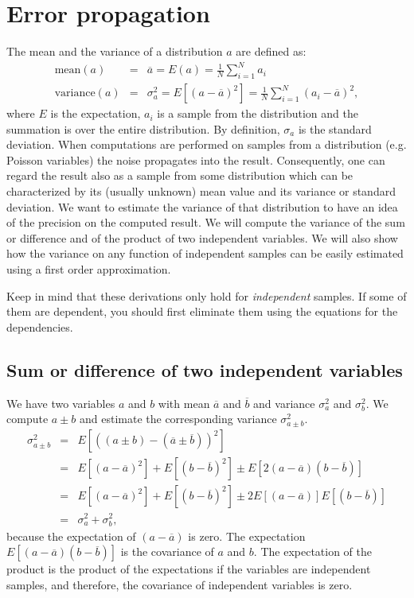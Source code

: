 \newpage
\section{Error propagation} \label{app:error}
The mean and the variance of a distribution $a$ are defined as:
\begin{align}
  \mbox{mean}(a) & = & \overline{a} = E(a) = \frac{1}{N} \sum_{i=1}^N a_i\\
  \mbox{variance}(a) & = & \sigma_a^2 = E\left[ (a - \overline{a})^2 \right]
   = \frac{1}{N} \sum_{i=1}^N (a_i - \overline{a})^2,
\end{align}
where $E$ is the expectation, $a_i$ is a sample from the distribution and the
summation is over the entire distribution. By definition, $\sigma_a$ is the
standard deviation. When computations are performed on samples from a
distribution (e.g. Poisson variables) the noise propagates into the
result. Consequently, one can regard the result also as a sample from some
distribution which can be characterized by its (usually unknown) mean value
and its variance or standard deviation. We want to estimate the variance of
that distribution to have an idea of the precision on the computed result. We
will compute the variance of the sum or difference and of the product of two
independent variables. We will also show how the variance on any function of
independent samples can be easily estimated using a first order approximation.

Keep in mind that these derivations only hold for {\em independent}
samples. If some of them are dependent, you should first eliminate them using
the equations for the dependencies.

\subsection{Sum or difference of two independent variables}
We have two variables $a$ and $b$ with mean $\overline{a}$ and $\overline{b}$
and variance $\sigma_a^2$ and $\sigma_b^2$. We compute $a \pm b$ and estimate
the corresponding variance $\sigma_{a \pm b}^2$.
\begin{align}
\sigma_{a \pm b}^2 & = & E\left[\left((a \pm b) - (\overline{a} \pm \overline{b}) \right)^2\right]
           \nonumber\\
 & = & E\left[(a-\overline{a})^2\right] + E\left[(b-\overline{b})^2\right] \pm E\left[2(a-\overline{a})(b-\overline{b})\right]
           \nonumber\\
 & = & E\left[(a-\overline{a})^2\right] + E\left[(b-\overline{b})^2\right] \pm 2 E\left[(a-\overline{a})\right]E\left[(b-\overline{b})\right]
           \nonumber\\
 & = & \sigma_a^2 + \sigma_b^2, \label{eq:app_sumerror}
\end{align}
because the expectation of $(a - \overline{a})$ is zero. The expectation
$E\left[(a-\overline{a})(b-\overline{b})\right]$ is the covariance of $a$ and $b$. The
expectation of the product is the product of the expectations if the
variables are independent samples, and therefore, the covariance of
independent variables is zero.

